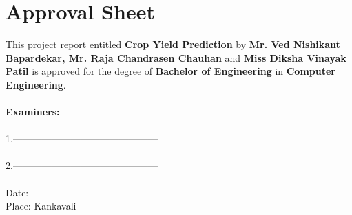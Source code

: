\chapter*{Approval Sheet}

This project report entitled \textbf{Crop Yield Prediction} by \textbf{Mr. Ved Nishikant Bapardekar, Mr. Raja Chandrasen Chauhan} and \textbf{Miss Diksha Vinayak Patil} is approved for the degree of \textbf{Bachelor of Engineering} in \textbf{Computer Engineering}.\\ \\
\textbf{Examiners:}\\ \\
1.---------------------------------------------\\ \\
2.---------------------------------------------\\ \\
Date:\\
Place: Kankavali
